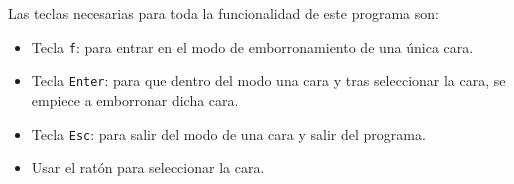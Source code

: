\documentclass[a4paper,10pt,titlepage,oneside,openright]{book}
\begin{document}
Las teclas necesarias para toda la funcionalidad de este programa son:
\begin{itemize}
 \item Tecla \texttt{f}: para entrar en el modo de emborronamiento de una única cara.
 \item Tecla \texttt{Enter}: para que dentro del modo una cara y tras seleccionar la cara, se empiece a emborronar dicha cara.
 \item Tecla \texttt{Esc}: para salir del modo de una cara y salir del programa.
 \item Usar el ratón para seleccionar la cara.
\end{itemize}
\end{document}
